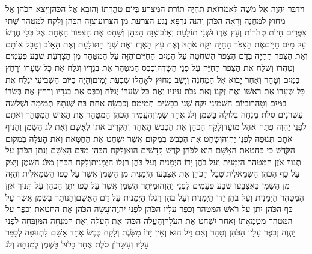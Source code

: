 \documentclass[../main/main.tex]{subfiles}
\begin{document}
\begin{multicols*}{\ncols}
וַיְדַבֵּר יַהְוֶה אֶל מֹשֶׁה לֵּאמֹר\PreVerseSpace{}זֹאת תִּהְיֶה תּוֹרַת הַמְּצֹרָע בְּיוֹם טָהֳרָתוֹ וְהוּבָא אֶל הַכֹּהֵן\PreVerseSpace{}וְיָצָא הַכֹּהֵן אֶל מִחוּץ לַמַּחֲנֶה וְרָאָה הַכֹּהֵן וְהִנֵּה נִרְפָּא נֶגַע הַצָּרַעַת מִן הַצָּרוּעַ\PreVerseSpace{}וְצִוָּה הַכֹּהֵן וְלָקַח לַמִּטַּהֵר שְׁתֵּי צִפֳּרִים חַיּוֹת טְהֹרוֹת וְעֵץ אֶרֶז וּשְׁנִי תוֹלַעַת וְאֵזֹב\PreVerseSpace{}וְצִוָּה הַכֹּהֵן וְשָׁחַט אֶת הַצִּפּוֹר הָאֶחָת אֶל כְּלִי חֶרֶשׂ עַל מַיִם חַיִּים\PreVerseSpace{}אֶת הַצִּפֹּר הַחַיָּה יִקַּח אֹתָהּ וְאֶת עֵץ הָאֶרֶז וְאֶת שְׁנִי הַתּוֹלַעַת וְאֶת הָאֵזֹב וְטָבַל אוֹתָם וְאֵת הַצִּפֹּר הַחַיָּה בְּדַם הַצִּפֹּר הַשְּׁחֻטָה עַל הַמַּיִם הַחַיִּים\PreVerseSpace{}וְהִזָּה עַל הַמִּטַּהֵר מִן הַצָּרַעַת שֶׁבַע פְּעָמִים וְטִהֲרוֹ וְשִׁלַּח אֶת הַצִּפֹּר הַחַיָּה עַל פְּנֵי הַשָּׂדֶה\PreVerseSpace{}וְכִבֶּס הַמִּטַּהֵר אֶת בְּגָדָיו וְגִלַּח אֶת כָּל שְׂעָרוֹ וְרָחַץ בַּמַּיִם וְטָהֵר וְאַחַר יָבוֹא אֶל הַמַּחֲנֶה וְיָשַׁב מִחוּץ לְאָהֳלוֹ שִׁבְעַת יָמִים\PreVerseSpace{}וְהָיָה בַיּוֹם הַשְּׁבִיעִי יְגַלַּח אֶת כָּל שְׂעָרוֹ אֶת רֹאשׁוֹ וְאֶת זְקָנוֹ וְאֵת גַּבֹּת עֵינָיו וְאֶת כָּל שְׂעָרוֹ יְגַלֵּחַ וְכִבֶּס אֶת בְּגָדָיו וְרָחַץ אֶת בְּשָׂרוֹ בַּמַּיִם וְטָהֵר\PreVerseSpace{}וּבַיּוֹם הַשְּׁמִינִי יִקַּח שְׁנֵי כְבָשִׂים תְּמִימִם וְכַבְשָׂה אַחַת בַּת שְׁנָתָהּ תְּמִימָה וּשְׁלֹשָׁה עֶשְׂרֹנִים סֹלֶת מִנְחָה בְּלוּלָה בַשֶּׁמֶן וְלֹג אֶחָד שָׁמֶן\PreVerseSpace{}וְהֶעֱמִיד הַכֹּהֵן הַמְטַהֵר אֵת הָאִישׁ הַמִּטַּהֵר וְאֹתָם לִפְנֵי יַהְוֶה פֶּתַח אֹהֶל מוֹעֵד\PreVerseSpace{}וְלָקַח הַכֹּהֵן אֶת הַכֶּבֶשׂ הָאֶחָד וְהִקְרִיב אֹתוֹ לְאָשָׁם וְאֶת לֹג הַשָּׁמֶן וְהֵנִיף אֹתָם תְּנוּפָה לִפְנֵי יַהְוֶה\PreVerseSpace{}וְשָׁחַט אֶת הַכֶּבֶשׂ בִּמְקוֹם אֲשֶׁר יִשְׁחַט אֶת הַחַטָּאת וְאֶת הָעֹלָה בִּמְקוֹם הַקֹּדֶשׁ כִּי כַּחַטָּאת הָאָשָׁם הוּא לַכֹּהֵן קֹדֶשׁ קָדָשִׁים הוּא\PreVerseSpace{}וְלָקַח הַכֹּהֵן מִדַּם הָאָשָׁם וְנָתַן הַכֹּהֵן עַל תְּנוּךְ אֹזֶן הַמִּטַּהֵר הַיְמָנִית וְעַל בֹּהֶן יָדוֹ הַיְמָנִית וְעַל בֹּהֶן רַגְלוֹ הַיְמָנִית\PreVerseSpace{}וְלָקַח הַכֹּהֵן מִלֹּג הַשָּׁמֶן וְיָצַק עַל כַּף הַכֹּהֵן הַשְּׂמָאלִית\PreVerseSpace{}וְטָבַל הַכֹּהֵן אֶת אֶצְבָּעוֹ הַיְמָנִית מִן הַשֶּׁמֶן אֲשֶׁר עַל כַּפּוֹ הַשְּׂמָאלִית וְהִזָּה מִן הַשֶּׁמֶן בְּאֶצְבָּעוֹ שֶׁבַע פְּעָמִים לִפְנֵי יַהְוֶה\PreVerseSpace{}וּמִיֶּתֶר הַשֶּׁמֶן אֲשֶׁר עַל כַּפּוֹ יִתֵּן הַכֹּהֵן עַל תְּנוּךְ אֹזֶן הַמִּטַּהֵר הַיְמָנִית וְעַל בֹּהֶן יָדוֹ הַיְמָנִית וְעַל בֹּהֶן רַגְלוֹ הַיְמָנִית עַל דַּם הָאָשָׁם\PreVerseSpace{}וְהַנּוֹתָר בַּשֶּׁמֶן אֲשֶׁר עַל כַּף הַכֹּהֵן יִתֵּן עַל רֹאשׁ הַמִּטַּהֵר וְכִפֶּר עָלָיו הַכֹּהֵן לִפְנֵי יַהְוֶה\PreVerseSpace{}וְעָשָׂה הַכֹּהֵן אֶת הַחַטָּאת וְכִפֶּר עַל הַמִּטַּהֵר מִטֻּמְאָתוֹ וְאַחַר יִשְׁחַט אֶת הָעֹלָה\PreVerseSpace{}וְהֶעֱלָה הַכֹּהֵן אֶת הָעֹלָה וְאֶת הַמִּנְחָה הַמִּזְבֵּחָה לִפְנֵי יַהְוֶה\OmitEnd{} וְכִפֶּר עָלָיו הַכֹּהֵן וְטָהֵר \ClosedSection{}וְאִם דַּל הוּא וְאֵין יָדוֹ מַשֶּׂגֶת וְלָקַח כֶּבֶשׂ אֶחָד אָשָׁם לִתְנוּפָה לְכַפֵּר עָלָיו וְעִשָּׂרוֹן סֹלֶת אֶחָד בָּלוּל בַּשֶּׁמֶן לְמִנְחָה וְלֹג 
\end{multicols*}
\end{document}
